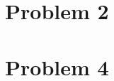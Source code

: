 \documentclass[11pt]{article}
\begin{document}
\section{Problem 2}

\section{Problem 4}

%
% 
% 
\end{document}
